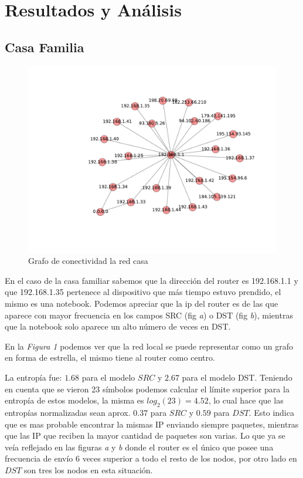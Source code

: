 \section{Resultados y An\'alisis}

\subsection{Casa Familia}

\FloatBarrier

\begin{figure}[!h]
	\begin{center}
		  \includegraphics[scale=0.75]{resultados/casa/conectividadNX.pdf}
		  \caption{Grafo de conectividad la red casa}
		  \label{fig:contra1}
	\end{center}
\end{figure}
	
\FloatBarrier

En el caso de la casa familiar sabemos que la direcci\'on del router
es 192.168.1.1 y que 192.168.1.35 pertenece al dispositivo que m\'as tiempo estuvo
prendido, el mismo es una notebook. Podemos apreciar que la ip del
router es de las que aparece con mayor frecuencia en los campos SRC (fig \emph{a}) 
o DST (fig \emph{b}), mientras que la notebook solo aparece un alto n\'umero de 
veces en DST. 

En la \emph{Figura 1} podemos ver que la red local se puede representar como 
un grafo en forma de estrella, el mismo tiene al router como centro. 

La entrop\'ia fue: $1.68$ para el modelo $SRC$ y $2.67$ para el modelo DST.
Teniendo en cuenta que se vieron 23 s\'imbolos podemos calcular el l\'imite
superior para la entrop\'ia de estos modelos, la misma es $log_2(23)=4.52$, lo 
cual hace que las entrop\'ias normalizadas sean aprox. $0.37$ para $SRC$ y 
$0.59$ para $DST$. Esto indica que es mas probable encontrar la mismas 
IP enviando siempre paquetes, mientras que las IP que reciben la mayor
cantidad de paquetes son varias. Lo que ya se ve\'ia reflejado en las figuras
\emph{a} y \emph{b} donde el router es el \'unico que posee una frecuencia de
env\'io 6 veces superior a todo el resto de los nodos, por otro lado en $DST$
son tres los nodos en esta situaci\'on.

